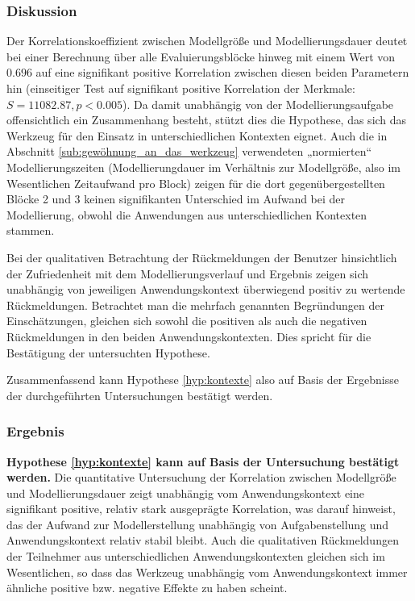 \subsubsection{Diskussion} 

Der Korrelationskoeffizient zwischen Modellgröße und Modellierungsdauer deutet bei einer Berechnung über alle Evaluierungsblöcke hinweg mit einem Wert von $0.696$ auf eine signifikant positive Korrelation zwischen diesen beiden Parametern hin (einseitiger Test auf signifikant positive Korrelation der Merkmale: $S=11082.87, p<0.005$). Da damit unabhängig von der Modellierungsaufgabe offensichtlich ein Zusammenhang besteht, stützt dies die Hypothese, das sich das Werkzeug für den Einsatz in unterschiedlichen Kontexten eignet. Auch die in Abschnitt \ref{sub:gewöhnung_an_das_werkzeug} verwendeten „normierten“ Modellierungszeiten (Modellierungdauer im Verhältnis zur Modellgröße, also im Wesentlichen Zeitaufwand pro Block) zeigen für die dort gegenübergestellten Blöcke 2 und 3 keinen signifikanten Unterschied im Aufwand bei der Modellierung, obwohl die Anwendungen aus unterschiedlichen Kontexten stammen.

Bei der qualitativen Betrachtung der Rückmeldungen der Benutzer hinsichtlich der Zufriedenheit mit dem Modellierungsverlauf und Ergebnis zeigen sich unabhängig von jeweiligen Anwendungskontext überwiegend positiv zu wertende Rückmeldungen. Betrachtet man die mehrfach genannten Begründungen der Einschätzungen, gleichen sich sowohl die positiven als auch die negativen Rückmeldungen in den beiden Anwendungskontexten. Dies spricht für die Bestätigung der untersuchten Hypothese.

Zusammenfassend kann Hypothese \ref{hyp:kontexte} also auf Basis der Ergebnisse der durchgeführten Untersuchungen bestätigt werden.

\subsubsection{Ergebnis} 

\textbf{Hypothese \ref{hyp:kontexte} kann auf Basis der Untersuchung bestätigt werden.} Die quantitative Untersuchung der Korrelation zwischen Modellgröße und Modellierungsdauer zeigt unabhängig vom Anwendungskontext eine signifikant positive, relativ stark ausgeprägte Korrelation, was darauf hinweist, das der Aufwand zur Modellerstellung unabhängig von Aufgabenstellung und Anwendungskontext relativ stabil bleibt. Auch die qualitativen Rückmeldungen der Teilnehmer aus unterschiedlichen Anwendungskontexten gleichen sich im Wesentlichen, so dass das Werkzeug unabhängig vom Anwendungskontext immer ähnliche positive bzw. negative Effekte zu haben scheint.

